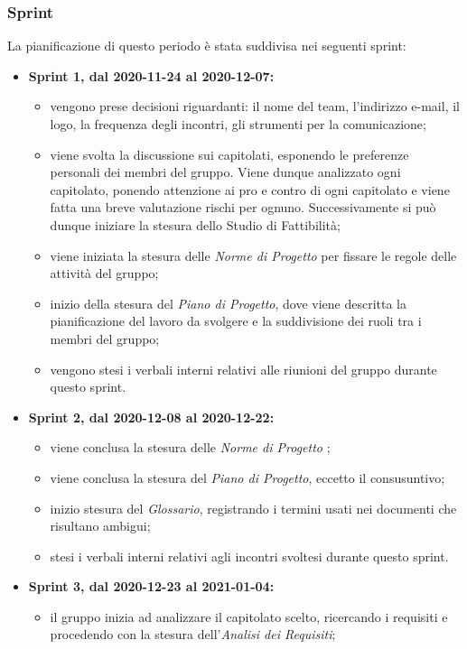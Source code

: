 \subsubsection{Sprint}
La pianificazione di questo periodo è stata suddivisa nei seguenti sprint:
\begin{itemize}
	\item \textbf{Sprint 1, dal 2020-11-24 al 2020-12-07:}
	\begin{itemize}
	\item vengono prese decisioni riguardanti: il nome del team, l'indirizzo e-mail, il logo, la frequenza degli incontri, gli strumenti per la comunicazione;
	\item viene svolta la discussione sui capitolati, esponendo le preferenze personali dei membri del gruppo. Viene dunque analizzato ogni capitolato, ponendo attenzione ai pro e contro di ogni capitolato e viene fatta una breve valutazione rischi per ognuno. Successivamente si può dunque iniziare la stesura dello Studio di Fattibilità;
	\item viene iniziata la stesura delle \textit{Norme di Progetto} per fissare le regole delle attività del gruppo;
	\item inizio della stesura del \textit{Piano di Progetto}, dove viene descritta la pianificazione del lavoro da svolgere e la suddivisione dei ruoli tra i membri del gruppo;
	\item vengono stesi i verbali interni relativi alle riunioni del gruppo durante questo sprint.
	\end{itemize}
	\item \textbf{Sprint 2, dal 2020-12-08 al 2020-12-22:}
	\begin{itemize}
		\item viene conclusa la stesura delle \textit{Norme di Progetto} ;
		\item viene conclusa la stesura del \textit{Piano di Progetto}, eccetto il consusuntivo;
		\item inizio stesura del \textit{Glossario}, registrando i termini usati nei documenti che risultano ambigui;
		\item stesi i verbali interni relativi agli incontri svoltesi durante questo sprint.
	\end{itemize}
	\item \textbf{Sprint 3, dal 2020-12-23 al 2021-01-04:}
	\begin{itemize}
		\item il gruppo inizia ad analizzare il capitolato scelto, ricercando i requisiti e procedendo con la stesura dell'\textit{Analisi dei Requisiti};

\end{itemize}
\end{itemize}
